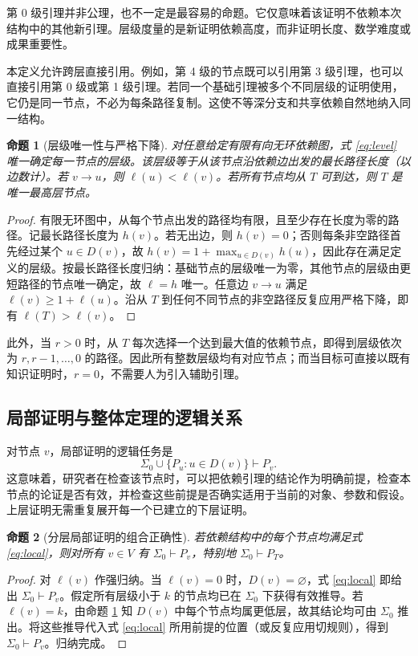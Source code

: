 \documentclass[UTF8,11pt,a4paper,fontset=fandol]{ctexart}
\newtheorem{proposition}{命题}
\theoremstyle{definition}\newtheorem{definition}{定义}
\begin{document}
第 0 级引理并非公理，也不一定是最容易的命题。它仅意味着该证明不依赖本次结构中的其他新引理。层级度量的是新证明依赖高度，而非证明长度、数学难度或成果重要性。

本定义允许跨层直接引用。例如，第 4 级的节点既可以引用第 3 级引理，也可以直接引用第 0 级或第 1 级引理。若同一个基础引理被多个不同层级的证明使用，它仍是同一节点，不必为每条路径复制。这使不等深分支和共享依赖自然地纳入同一结构。

\begin{proposition}[层级唯一性与严格下降]\label{prop:height}
对任意给定有限有向无环依赖图，式 \eqref{eq:level} 唯一确定每一节点的层级。该层级等于从该节点沿依赖边出发的最长路径长度（以边数计）。若 $v\to u$，则 $\ell(u)<\ell(v)$。若所有节点均从 $T$ 可到达，则 $T$ 是唯一最高层节点。
\end{proposition}
\begin{proof}
有限无环图中，从每个节点出发的路径均有限，且至少存在长度为零的路径。记最长路径长度为 $h(v)$。若无出边，则 $h(v)=0$；否则每条非空路径首先经过某个 $u\in D(v)$，故 $h(v)=1+\max_{u\in D(v)}h(u)$，因此存在满足定义的层级。按最长路径长度归纳：基础节点的层级唯一为零，其他节点的层级由更短路径的节点唯一确定，故 $\ell=h$ 唯一。任意边 $v\to u$ 满足 $\ell(v)\ge 1+\ell(u)$。沿从 $T$ 到任何不同节点的非空路径反复应用严格下降，即有 $\ell(T)>\ell(v)$。
\end{proof}

此外，当 $r>0$ 时，从 $T$ 每次选择一个达到最大值的依赖节点，即得到层级依次为 $r,r-1,\ldots,0$ 的路径。因此所有整数层级均有对应节点；而当目标可直接以既有知识证明时，$r=0$，不需要人为引入辅助引理。

\subsection{局部证明与整体定理的逻辑关系}
对节点 $v$，局部证明的逻辑任务是
\begin{equation}\label{eq:local}
 \Sigma_0\cup\{P_u:u\in D(v)\}\vdash P_v.
\end{equation}
这意味着，研究者在检查该节点时，可以把依赖引理的结论作为明确前提，检查本节点的论证是否有效，并检查这些前提是否确实适用于当前的对象、参数和假设。上层证明无需重复展开每一个已建立的下层证明。

\begin{proposition}[分层局部证明的组合正确性]\label{prop:composition}
若依赖结构中的每个节点均满足式 \eqref{eq:local}，则对所有 $v\in V$ 有 $\Sigma_0\vdash P_v$，特别地 $\Sigma_0\vdash P_T$。
\end{proposition}
\begin{proof}
对 $\ell(v)$ 作强归纳。当 $\ell(v)=0$ 时，$D(v)=\varnothing$，式 \eqref{eq:local} 即给出 $\Sigma_0\vdash P_v$。假定所有层级小于 $k$ 的节点均已在 $\Sigma_0$ 下获得有效推导。若 $\ell(v)=k$，由命题 \ref{prop:height} 知 $D(v)$ 中每个节点均属更低层，故其结论均可由 $\Sigma_0$ 推出。将这些推导代入式 \eqref{eq:local} 所用前提的位置（或反复应用切规则），得到 $\Sigma_0\vdash P_v$。归纳完成。
\end{proof}
\end{document}
